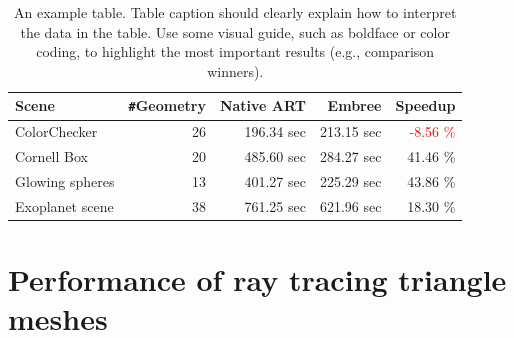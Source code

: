 \begin{table}
	\centering
	{\footnotesize\sf
		\begin{tabular}{lrrrr}
			\toprule
			Scene & \Verb!#!Geometry & Native ART & Embree & Speedup \\ 
			\midrule
			ColorChecker & 26 & 196.34 sec & 213.15 sec & \textcolor{red}{-8.56 \%} \\
			Cornell Box & 20 & 485.60 sec & 284.27 sec & 41.46 \% \\
			Glowing spheres & 13 & 401.27 sec & 225.29 sec & 43.86 \%  \\
			Exoplanet scene & 38 & 761.25 sec & 621.96 sec & 18.30 \% \\
			\bottomrule
	\end{tabular}}
	\caption{An example table. Table caption should clearly explain how to interpret the data in the table. Use some visual guide, such as boldface or color coding, to highlight the most important results (e.g., comparison winners).}
	\label{tab:scenes}
\end{table}


\section{Performance of ray tracing triangle meshes}
\label{sec:result_meshes}

